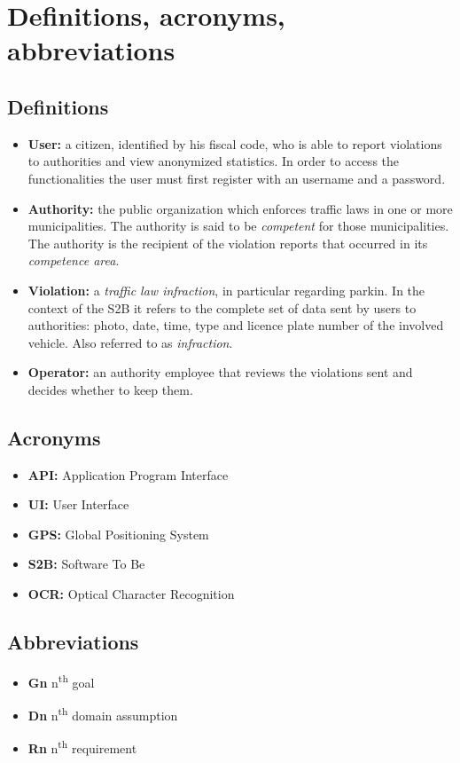 \section{Definitions, acronyms, abbreviations}

\subsection{Definitions}
\begin{itemize}
    \item \textbf{User:} a citizen, identified by his fiscal code, who
    is able to report violations to authorities and view anonymized statistics.
    In order to access the functionalities the user must first register
    with an username and a password.
    \item \textbf{Authority:} the public organization which enforces traffic
    laws in one or more municipalities.
    The authority is said to be \emph{competent} for those municipalities.
    The authority is the recipient of the violation reports that occurred
    in its \emph{competence area}.
    \item \textbf{Violation:} a \emph{traffic law infraction}, in particular
    regarding parkin.
    In the context of the S2B it refers to the complete set of data sent by
    users to authorities: photo, date, time, type and licence plate number
    of the involved vehicle. Also referred to as \emph{infraction}.
    \item \textbf{Operator:} an authority employee that reviews the violations
    sent and decides whether to keep them.
\end{itemize}

\subsection{Acronyms}
\begin{itemize}
    \item \textbf{API:} Application Program Interface
    \item \textbf{UI:} User Interface
    \item \textbf{GPS:} Global Positioning System
    \item \textbf{S2B:} Software To Be
    \item \textbf{OCR:} Optical Character Recognition
\end{itemize}

\subsection{Abbreviations}
\begin{itemize}
    \item \textbf{Gn} n\textsuperscript{th} goal
    \item \textbf{Dn} n\textsuperscript{th} domain assumption
    \item \textbf{Rn} n\textsuperscript{th} requirement
\end{itemize}